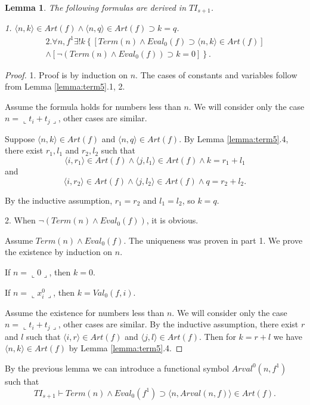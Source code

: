 \documentclass{asl}
\newtheorem{lemma}{Lemma}[section]
\theoremstyle{definition}
\begin{document}
\begin{lemma}
The following formulas are derived in $TI_{s+1}$.

1. $\langle n,k\rangle\in Art(f)\wedge\langle n,q\rangle\in Art(f)\supset k=q$.
\begin{multline*}
2. \forall n,f^1\exists !k\left\lbrace \left[ Term(n)\wedge Eval_0(f)\supset \langle n,k\rangle\in Art(f)\right] 
\right.
\\
\left.
\wedge\left[\neg (Term(n)\wedge Eval_0(f))\supset k=0\right] \right\rbrace.
\end{multline*}
\label{lemma:term6}
\end{lemma}
\begin{proof}
1. Proof is by induction on $n$. The cases of constants and variables follow from Lemma \ref{lemma:term5}.1, 2.

Assume the formula holds for numbers less than $n$. We will consider only the case $n=\llcorner t_i+ t_j\lrcorner$, other cases are similar.

Suppose $\langle n,k\rangle\in Art(f)$ and $\langle n,q\rangle\in Art(f)$. By Lemma \ref{lemma:term5}.4, there exist $r_1, l_1$ and $r_2, l_2$ such that 
\[\langle i,r_1\rangle\in Art(f)\wedge
\langle j,l_1\rangle\in Art(f)\wedge
k=r_1+l_1\]
and
\[\langle i,r_2\rangle\in Art(f)\wedge
\langle j,l_2\rangle\in Art(f)\wedge
q=r_2+l_2.\]

By the inductive assumption, $r_1=r_2$ and $l_1=l_2$, so $k=q$.

2. When $\neg (Term(n)\wedge Eval_0(f))$, it is obvious. 

Assume $Term(n)\wedge Eval_0(f)$. The uniqueness was proven in part 1. We prove the existence by induction on $n$.

If $n=\llcorner 0\lrcorner$, then $k=0$.

If $n=\llcorner x_i^0\lrcorner$, then $k=Val_0(f,i)$.

Assume the existence for numbers less than $n$. We will consider only the case $n=\llcorner t_i+t_j\lrcorner$, other cases are similar. By the inductive assumption, there exist $r$ and $l$ such that $\langle i,r\rangle\in Art(f)$ and $\langle j,l\rangle\in Art(f)$. Then for $k=r+l$ we have $\langle n,k\rangle\in Art(f)$ by Lemma \ref{lemma:term5}.4.
\end{proof}

By the previous lemma we can introduce a functional symbol $Arval^0(n,f^1)$ such that 
\[TI_{s+1}\vdash Term(n)\wedge Eval_0(f^1)\supset \langle n,Arval(n,f)\rangle\in Art(f).\]
\end{document}
